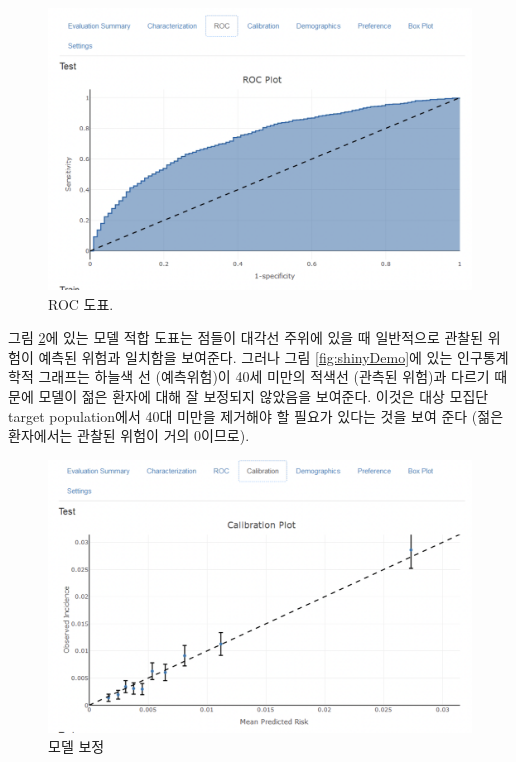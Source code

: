 \documentclass[10.5pt]{book}
\theoremstyle{definition}
\theoremstyle{definition}
\theoremstyle{definition}
\theoremstyle{remark}
\begin{document}
\begin{figure}

{\centering \includegraphics[width=1\linewidth]{images/PatientLevelPrediction/shiny/singleShiny/singleShinyRoc} 

}

\caption{ROC 도표.}\label{fig:shinyROC}
\end{figure}

그림 \ref{fig:shinyCal}에 있는 모델 적합 도표는 점들이 대각선 주위에
있을 때 일반적으로 관찰된 위험이 예측된 위험과 일치함을 보여준다. 그러나
그림 \ref{fig:shinyDemo}에 있는 인구통계학적 그래프는 하늘색 선
(예측위험)이 40세 미만의 적색선 (관측된 위험)과 다르기 때문에 모델이
젊은 환자에 대해 잘 보정되지 않았음을 보여준다. 이것은 대상 모집단
target population에서 40대 미만을 제거해야 할 필요가 있다는 것을 보여
준다 (젊은 환자에서는 관찰된 위험이 거의 0이므로).

\begin{figure}

{\centering \includegraphics[width=1\linewidth]{images/PatientLevelPrediction/shiny/singleShiny/singleShinyCal} 

}

\caption{모델 보정}\label{fig:shinyCal}
\end{figure}
\end{document}
